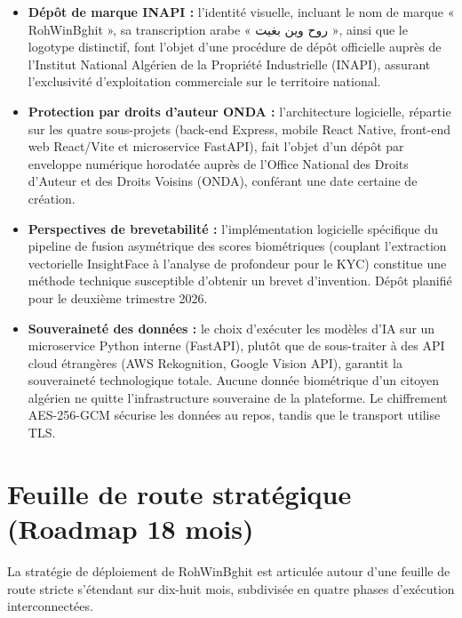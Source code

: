 \documentclass[12pt, a4paper, oneside]{report}
\begin{document}
\begin{itemize}
\item
  \textbf{Dépôt de marque INAPI :} l'identité visuelle, incluant le nom de marque « RohWinBghit », sa transcription arabe « \textarabic{روح وين بغيت} », ainsi que le logotype distinctif, font l'objet d'une procédure de dépôt officielle auprès de l'Institut National Algérien de la Propriété Industrielle (INAPI), assurant l'exclusivité d'exploitation commerciale sur le territoire national.
\item
  \textbf{Protection par droits d'auteur ONDA :} l'architecture logicielle, répartie sur les quatre sous-projets (back-end Express, mobile React Native, front-end web React/Vite et microservice FastAPI), fait l'objet d'un dépôt par enveloppe numérique horodatée auprès de l'Office National des Droits d'Auteur et des Droits Voisins (ONDA), conférant une date certaine de création.
\item
  \textbf{Perspectives de brevetabilité :} l'implémentation logicielle spécifique du pipeline de fusion asymétrique des scores biométriques (couplant l'extraction vectorielle InsightFace à l'analyse de profondeur pour le KYC) constitue une méthode technique susceptible d'obtenir un brevet d'invention. Dépôt planifié pour le deuxième trimestre 2026.
\item
  \textbf{Souveraineté des données :} le choix d'exécuter les modèles d'IA sur un microservice Python interne (FastAPI), plutôt que de sous-traiter à des API cloud étrangères (AWS Rekognition, Google Vision API), garantit la souveraineté technologique totale. Aucune donnée biométrique d'un citoyen algérien ne quitte l'infrastructure souveraine de la plateforme. Le chiffrement AES-256-GCM sécurise les données au repos, tandis que le transport utilise TLS.
\end{itemize}

\section{Feuille de route stratégique (Roadmap 18 mois)}

La stratégie de déploiement de RohWinBghit est articulée autour d'une feuille de route stricte s'étendant sur dix-huit mois, subdivisée en quatre phases d'exécution interconnectées.
\end{document}
